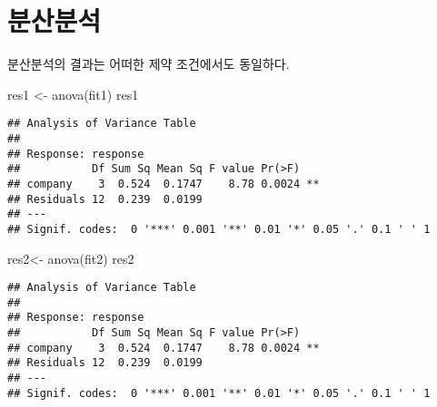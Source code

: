 \documentclass[
]{book}
\newenvironment{Shaded}{\begin{snugshade}}{\end{snugshade}}
\newcommand{\FunctionTok}[1]{\textcolor[rgb]{0.00,0.00,0.00}{#1}}
\newcommand{\NormalTok}[1]{#1}
\newcommand{\OtherTok}[1]{\textcolor[rgb]{0.56,0.35,0.01}{#1}}
\begin{document}
\hypertarget{uxbd84uxc0b0uxbd84uxc11d}{%
\section{분산분석}\label{uxbd84uxc0b0uxbd84uxc11d}}

분산분석의 결과는 어떠한 제약 조건에서도 동일하다.

\begin{Shaded}
\begin{Highlighting}[]
\NormalTok{res1 }\OtherTok{\textless{}{-}} \FunctionTok{anova}\NormalTok{(fit1)}
\NormalTok{res1}
\end{Highlighting}
\end{Shaded}

\begin{verbatim}
## Analysis of Variance Table
## 
## Response: response
##           Df Sum Sq Mean Sq F value Pr(>F)   
## company    3  0.524  0.1747    8.78 0.0024 **
## Residuals 12  0.239  0.0199                  
## ---
## Signif. codes:  0 '***' 0.001 '**' 0.01 '*' 0.05 '.' 0.1 ' ' 1
\end{verbatim}

\begin{Shaded}
\begin{Highlighting}[]
\NormalTok{res2}\OtherTok{\textless{}{-}} \FunctionTok{anova}\NormalTok{(fit2)}
\NormalTok{res2}
\end{Highlighting}
\end{Shaded}

\begin{verbatim}
## Analysis of Variance Table
## 
## Response: response
##           Df Sum Sq Mean Sq F value Pr(>F)   
## company    3  0.524  0.1747    8.78 0.0024 **
## Residuals 12  0.239  0.0199                  
## ---
## Signif. codes:  0 '***' 0.001 '**' 0.01 '*' 0.05 '.' 0.1 ' ' 1
\end{verbatim}

  
\end{document}
